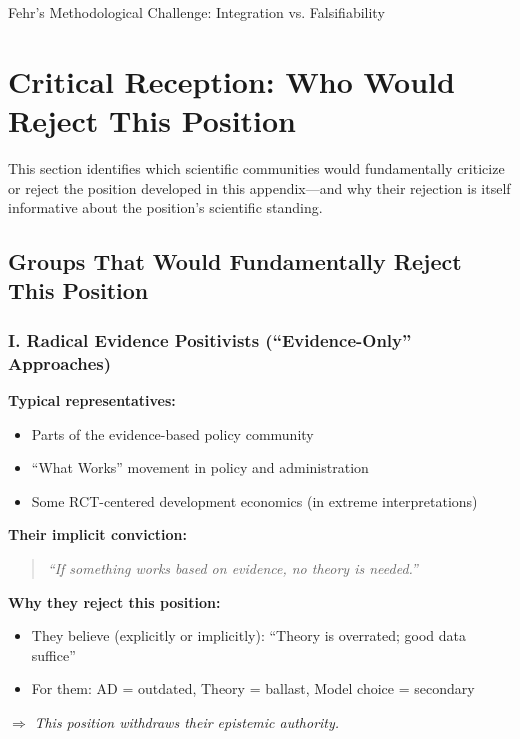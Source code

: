 \begin{chapter}{Fehr's Methodological Challenge: Integration vs. Falsifiability}
\section{Critical Reception: Who Would Reject This Position}
\label{sec:critical-reception}

This section identifies which scientific communities would fundamentally criticize
or reject the position developed in this appendix---and why their rejection
is itself informative about the position's scientific standing.

\subsection{Groups That Would Fundamentally Reject This Position}

\subsubsection{I. Radical Evidence Positivists (``Evidence-Only'' Approaches)}

\textbf{Typical representatives:}
\begin{itemize}[noitemsep]
    \item Parts of the evidence-based policy community
    \item ``What Works'' movement in policy and administration
    \item Some RCT-centered development economics (in extreme interpretations)
\end{itemize}

\textbf{Their implicit conviction:}
\begin{quote}
\textit{``If something works based on evidence, no theory is needed.''}
\end{quote}

\textbf{Why they reject this position:}
\begin{itemize}[noitemsep]
    \item They believe (explicitly or implicitly): ``Theory is overrated; good data suffice''
    \item For them: AD = outdated, Theory = ballast, Model choice = secondary
\end{itemize}

$\Rightarrow$ \textit{This position withdraws their epistemic authority.}


\end{chapter}
